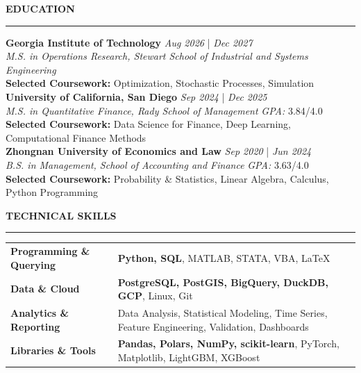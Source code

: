 \documentclass{../../../original_CV/resume}
\renewcommand{\sectionskip}{\vspace{0.10cm}}
\renewcommand{\sectionlineskip}{\vspace{0.10cm}}
\renewenvironment{rSection}[1]{
\sectionskip
\textcolor{UC San Diego Blue}{\textbf{\large\bfseries\MakeUppercase{#1}}}
\sectionlineskip
\hrule
\begin{list}{}{
\setlength{\leftmargin}{0em}
}
\item[]
}{
\end{list}
}
\begin{document}
\thispagestyle{empty}

\begin{rSection}{EDUCATION}
{\bf Georgia Institute of Technology} \hfill {\em Aug 2026} | {\em Dec 2027}
\\ \textit{M.S. in Operations Research, Stewart School of Industrial and Systems Engineering} \\
\textbf{Selected Coursework:} Optimization, Stochastic Processes, Simulation \\
{\bf University of California, San Diego} \hfill {\em Sep 2024} | {\em Dec 2025}
\\ \textit{M.S. in Quantitative Finance, Rady School of Management} \hfill \textit{GPA:} 3.84/4.0 \\
\textbf{Selected Coursework:} Data Science for Finance, Deep Learning, Computational Finance Methods \\
{\bf Zhongnan University of Economics and Law} \hfill {\em Sep 2020} | {\em Jun 2024}
\\ \textit{B.S. in Management, School of Accounting and Finance} \hfill \textit{GPA:} 3.63/4.0 \\
\textbf{Selected Coursework:} Probability \& Statistics, Linear Algebra, Calculus, Python Programming
\end{rSection}

\begin{rSection}{TECHNICAL SKILLS} \itemsep -2pt
\begin{tabularx}{\textwidth}{@{} >{\bfseries}l >{\raggedleft\arraybackslash}X @{}}
Programming \& Querying & \textbf{Python, SQL}, MATLAB, STATA, VBA, \LaTeX \\
Data \& Cloud & \textbf{PostgreSQL, PostGIS, BigQuery, DuckDB, GCP}, Linux, Git \\
Analytics \& Reporting & Data Analysis, Statistical Modeling, Time Series, Feature Engineering, Validation, Dashboards \\
Libraries \& Tools & \textbf{Pandas, Polars, NumPy, scikit-learn}, PyTorch, Matplotlib, LightGBM, XGBoost \\
\end{tabularx}
\end{rSection}
\end{document}
